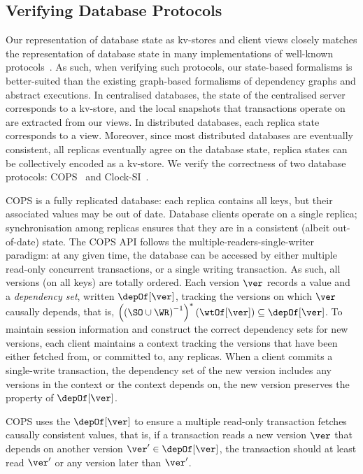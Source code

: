 \subsection{Verifying Database Protocols}
\label{sec:verify-impl}
Our representation of database state as kv-stores and client views closely matches the representation of database state in many implementations of 
well-known protocols~\cite{ramp,rola,cops,wren,redblue,PSI,NMSI,gdur,clocksi,distrsi}.
As such, when verifying such protocols, our state-based formalisms is better-suited than the existing graph-based formalisms of dependency graphs and abstract executions. 
In centralised databases, the state of the centralised server corresponds to a kv-store,
and the local snapshots that transactions operate on are extracted from our views.  
In distributed databases, each replica state corresponds to a view. 
Moreover, since most distributed databases are eventually consistent, 
\ie all replicas eventually agree on the database state,
replica states can be collectively encoded as a kv-store.
We verify the correctness of two database protocols:
COPS~\cite{cops} and Clock-SI~\cite{clocksi}.

COPS is a fully replicated database: each replica contains all keys, but their associated values may be out of date.
Database clients operate on a single replica; 
synchronisation among replicas ensures that they are in a consistent (albeit out-of-date) state.
The COPS API follows the multiple-readers-single-writer paradigm: 
at any given time, the database can be accessed by either multiple read-only concurrent transactions, or a single writing transaction. 
As such, all versions (on all keys) are totally ordered. 
Each version $\ver$ records a value and a \emph{dependency set}, written $\depOf[\ver]$,
tracking the versions on which $\ver$ causally depends, that is, 
\( \left( \left( \SO \cup \WR \right) ^{-1}\right)^{*}(\wtOf[\ver]) \subseteq \depOf[\ver] \).
To maintain session information and construct the correct dependency sets for new versions,
each client maintains a context tracking the versions that have been either fetched from, or committed to, any replicas.
When a client commits a single-write transaction,
the dependency set of the new version includes any versions in the context or the context depends on,
the new version preserves the property of \( \depOf[\ver] \).

COPS uses the $\depOf[\ver]$ to ensure a multiple read-only transaction fetches causally consistent values,
that is, if a transaction reads a new version \( \ver \) that depends on another version \( \ver' \in \depOf[\ver]\), 
the transaction should at least read \( \ver' \) or any version later than \( \ver' \).


